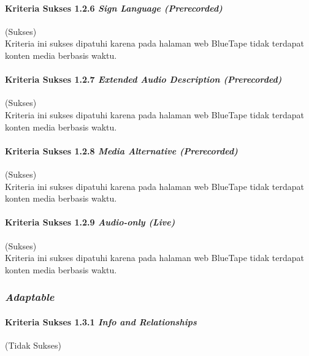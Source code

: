 \paragraph{Kriteria Sukses 1.2.6 \textit{Sign Language (Prerecorded)}}
\label{par:kepatuhan_bluetape_kriteria_sukses_1.2.6}
(Sukses)\\

Kriteria ini sukses dipatuhi karena pada halaman web BlueTape tidak terdapat konten media berbasis waktu.

\paragraph{Kriteria Sukses 1.2.7 \textit{Extended Audio Description (Prerecorded)}}
\label{par:kepatuhan_bluetape_kriteria_sukses_1.2.7}
(Sukses)\\

Kriteria ini sukses dipatuhi karena pada halaman web BlueTape tidak terdapat konten media berbasis waktu.

\paragraph{Kriteria Sukses 1.2.8 \textit{Media Alternative (Prerecorded)}}
\label{par:kepatuhan_bluetape_kriteria_sukses_1.2.8}
(Sukses)\\

Kriteria ini sukses dipatuhi karena pada halaman web BlueTape tidak terdapat konten media berbasis waktu.

\paragraph{Kriteria Sukses 1.2.9 \textit{Audio-only (Live)}}
\label{par:kepatuhan_bluetape_kriteria_sukses_1.2.9}
(Sukses)\\

Kriteria ini sukses dipatuhi karena pada halaman web BlueTape tidak terdapat konten media berbasis waktu.

\subsubsection{\textit{Adaptable}}
\label{subsubsec:kepatuhan_bluetape_adaptable}

\paragraph{Kriteria Sukses 1.3.1 \textit{Info and Relationships}}
\label{par:kepatuhan_bluetape_kriteria_sukses_1.3.1}
(Tidak Sukses)\\

